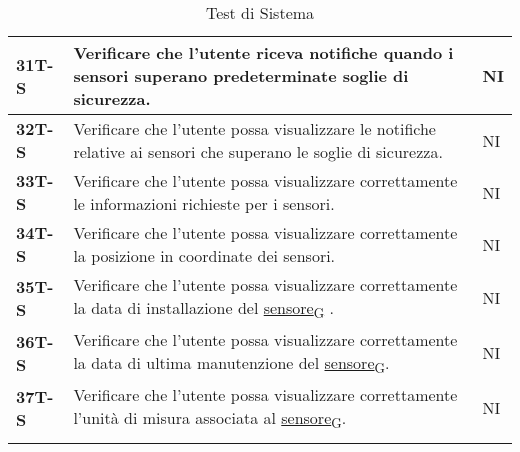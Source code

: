 \begin{longtable}{|>{\raggedright\arraybackslash}m{}|>{\raggedright\arraybackslash}m{}|>{\raggedright\arraybackslash}m{}|}
	\hline
	\textbf{31T-S}  & Verificare che l’utente riceva notifiche quando i sensori superano predeterminate soglie di sicurezza.                                                                             & NI             \\
	\hline
	\textbf{32T-S}  & Verificare che l’utente possa visualizzare le notifiche relative ai sensori che superano le soglie di sicurezza.                                                                   & NI             \\
	\hline
	\textbf{33T-S}  & Verificare che l’utente possa visualizzare correttamente le informazioni richieste per i sensori.                                                                                  & NI             \\
	\hline
	\textbf{34T-S}  & Verificare che l’utente possa visualizzare correttamente la posizione in coordinate dei sensori.                                                                                   & NI             \\
	\hline
	\textbf{35T-S}  & Verificare che l’utente possa visualizzare correttamente la data di installazione del \href{https://7last.github.io/docs/rtb/documentazione-interna/glossario\#sensore}{sensore\textsubscript{G}} .                                                                                    & NI             \\
	\hline
	\textbf{36T-S}  & Verificare che l’utente possa visualizzare correttamente la data di ultima manutenzione del \href{https://7last.github.io/docs/rtb/documentazione-interna/glossario\#sensore}{sensore\textsubscript{G}}.                                                                               & NI             \\
	\hline
	\textbf{37T-S}  & Verificare che l’utente possa visualizzare correttamente l’unità di misura associata al \href{https://7last.github.io/docs/rtb/documentazione-interna/glossario\#sensore}{sensore\textsubscript{G}}.                                                                                   & NI             \\
	\hline
	\caption{Test di Sistema}
\end{longtable}

